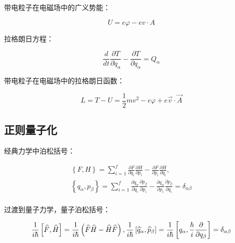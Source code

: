 带电粒子在电磁场中的广义势能：

\begin{equation}\label{18-2}
U = e\varphi  - ev \cdot A
\end{equation}

拉格朗日方程：

\begin{equation}
\frac{d}{{dt}}\frac{{\partial T}}{{\partial \dot q_\alpha  }} - \frac{{\partial T}}{{\partial q_\alpha  }} = Q_\alpha 
\end{equation}

带电粒子在电磁场中的拉格朗日函数：

\begin{equation}\label{18-3}
L = T - U = \frac{1}{2}mv^2  - e\varphi  + e\vec v \cdot \vec A
\end{equation}

\subsection{正则量子化}

经典力学中泊松括号：



\begin{equation}\label{18-4}
\begin{array}{l}
\left\{ {F,H} \right\} = \sum\limits_{i = 1}^f {\frac{{\partial F}}{{\partial q_i }}\frac{{\partial H}}{{\partial p_i }} - \frac{{\partial F}}{{\partial p_i }}\frac{{\partial H}}{{\partial q_i }}}, \\
\left\{ {q_\alpha  ,p_\beta  } \right\} = \sum\limits_{i = 1}^f {\frac{{\partial q_\alpha  }}{{\partial q_i }}\frac{{\partial p_\beta  }}{{\partial p_i }} - \frac{{\partial q_\alpha  }}{{\partial p_i }}\frac{{\partial p_\beta  }}{{\partial q_i }}}  = \delta _{\alpha \beta } \\
\end{array} 
\end{equation}

过渡到量子力学，量子泊松括号：

\begin{equation}\label{18-5}
\frac{1}{{i\hbar }}\left[ {\widehat F,\widehat H} \right] = \frac{1}{{i\hbar }}\left( {\widehat F\widehat H - \widehat H\widehat F} \right), \\
\frac{1}{{i\hbar }}\left[ {\widehat q_\alpha  ,\widehat p_\beta  } \right] = \frac{1}{{i\hbar }}\left[ {q_\alpha  ,\frac{\hbar }{i}\frac{\partial }{{\partial q_\beta  }}} \right] = \delta _{\alpha \beta }
\end{equation}


